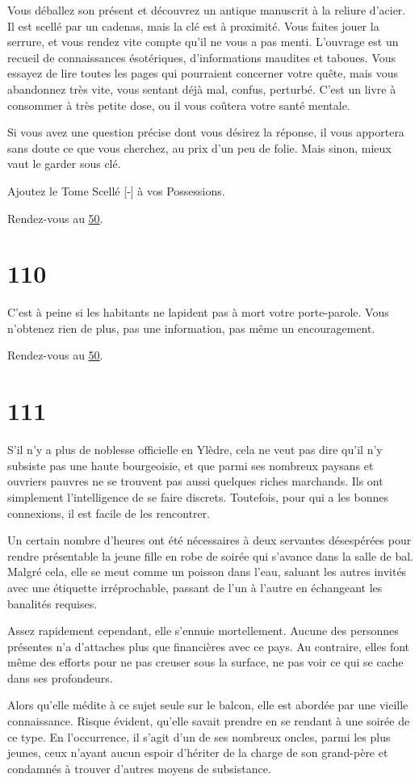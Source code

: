 \documentclass{report}
\newcommand{\gsection}[1]{
    \section{#1}
    \label{section-#1}
}
\newcommand{\glink}[1]{\hyperref[section-#1]{#1}}
\begin{document}
Vous déballez son présent et découvrez un antique manuscrit à la reliure d'acier. Il est scellé par un cadenas, mais la clé est à proximité. Vous faites jouer la serrure, et vous rendez vite compte qu'il ne vous a pas menti. L'ouvrage est un recueil de connaissances ésotériques, d'informations maudites et taboues. Vous essayez de lire toutes les pages qui pourraient concerner votre quête, mais vous abandonnez très vite, vous sentant déjà mal, confus, perturbé. C'est un livre à consommer à très petite dose, ou il vous coûtera votre santé mentale.

Si vous avez une question précise dont vous désirez la réponse, il vous apportera sans doute ce que vous cherchez, au prix d'un peu de folie. Mais sinon, mieux vaut le garder sous clé.

Ajoutez le Tome Scellé [-] à vos Possessions.

Rendez-vous au \glink{50}.

\gsection{110}

C'est à peine si les habitants ne lapident pas à mort votre porte-parole. Vous n'obtenez rien de plus, pas une information, pas même un encouragement.

Rendez-vous au \glink{50}.

\gsection{111}

S'il n'y a plus de noblesse officielle en Ylèdre, cela ne veut pas dire qu'il n'y subsiste pas une haute bourgeoisie, et que parmi ses nombreux paysans et ouvriers pauvres ne se trouvent pas aussi quelques riches marchands. Ils ont simplement l'intelligence de se faire discrets. Toutefois, pour qui a les bonnes connexions, il est facile de les rencontrer.

Un certain nombre d'heures ont été nécessaires à deux servantes désespérées pour rendre présentable la jeune fille en robe de soirée qui s'avance dans la salle de bal. Malgré cela, elle se meut comme un poisson dans l'eau, saluant les autres invités avec une étiquette irréprochable, passant de l'un à l'autre en échangeant les banalités requises.

Assez rapidement cependant, elle s'ennuie mortellement. Aucune des personnes présentes n'a d'attaches plus que financières avec ce pays. Au contraire, elles font même des efforts pour ne pas creuser sous la surface, ne pas voir ce qui se cache dans ses profondeurs.

Alors qu'elle médite à ce sujet seule sur le balcon, elle est abordée par une vieille connaissance. Risque évident, qu'elle savait prendre en se rendant à une soirée de ce type. En l’occurrence, il s'agit d'un de ses nombreux oncles, parmi les plus jeunes, ceux n'ayant aucun espoir d'hériter de la charge de son grand-père et condamnés à trouver d'autres moyens de subsistance.
\end{document}
